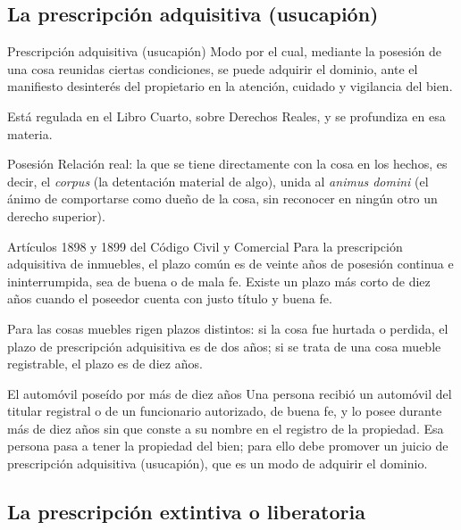 \documentclass[12pt,oneside]{book}
\begin{document}
\subsection{La prescripción adquisitiva (usucapión)}

\begin{definition}{Prescripción adquisitiva (usucapión)}
Modo por el cual, mediante la posesión de una cosa reunidas ciertas condiciones, se puede adquirir el dominio, ante el manifiesto desinterés del propietario en la atención, cuidado y vigilancia del bien.
\end{definition}

Está regulada en el Libro Cuarto, sobre Derechos Reales, y se profundiza en esa materia.

\begin{definition}{Posesión}
Relación real: la que se tiene directamente con la cosa en los hechos, es decir, el \textit{corpus} (la detentación material de algo), unida al \textit{animus domini} (el ánimo de comportarse como dueño de la cosa, sin reconocer en ningún otro un derecho superior).
\end{definition}

\begin{articulo}{Artículos 1898 y 1899 del Código Civil y Comercial}
Para la prescripción adquisitiva de inmuebles, el plazo común es de veinte años de posesión continua e ininterrumpida, sea de buena o de mala fe. Existe un plazo más corto de diez años cuando el poseedor cuenta con justo título y buena fe.
\end{articulo}

Para las cosas muebles rigen plazos distintos: si la cosa fue hurtada o perdida, el plazo de prescripción adquisitiva es de dos años; si se trata de una cosa mueble registrable, el plazo es de diez años.

\begin{example}{El automóvil poseído por más de diez años}
Una persona recibió un automóvil del titular registral o de un funcionario autorizado, de buena fe, y lo posee durante más de diez años sin que conste a su nombre en el registro de la propiedad. Esa persona pasa a tener la propiedad del bien; para ello debe promover un juicio de prescripción adquisitiva (usucapión), que es un modo de adquirir el dominio.
\end{example}

\subsection{La prescripción extintiva o liberatoria}
\end{document}

